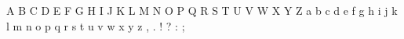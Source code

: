 \noindent\spacer%
A\spacer%
B\spacer%
C\spacer%
D\spacer%
E\spacer%
F\spacer%
G\spacer%
H\spacer%
I\spacer%
J\spacer%
K\spacer%
L\spacer%
M\spacer%
N\spacer%
O\spacer%
P\spacer%
Q\spacer%
R\spacer%
S\spacer%
T\spacer%
U\spacer%
V\spacer%
W\spacer%
X\spacer%
Y\spacer%
Z\spacer%
\null\hspace{0.9ex}\spacer%
a\spacer%
b\spacer%
c\spacer%
d\spacer%
e\spacer%
f\hspace{0.6pt}\spacer%
g\spacer%
h\spacer%
i\spacer%
\hspace{0.8pt}j\spacer%
k\spacer%
l\spacer%
m\spacer%
n\spacer%
o\spacer%
p\spacer%
q\spacer%
r\spacer%
s\spacer%
t\spacer%
u\spacer%
v\spacer%
w\spacer%
x\spacer%
y\spacer%
z\spacer%
,\spacer%
.\spacer%
!\spacer%
?\spacer%
:\spacer%
;\spacer%

